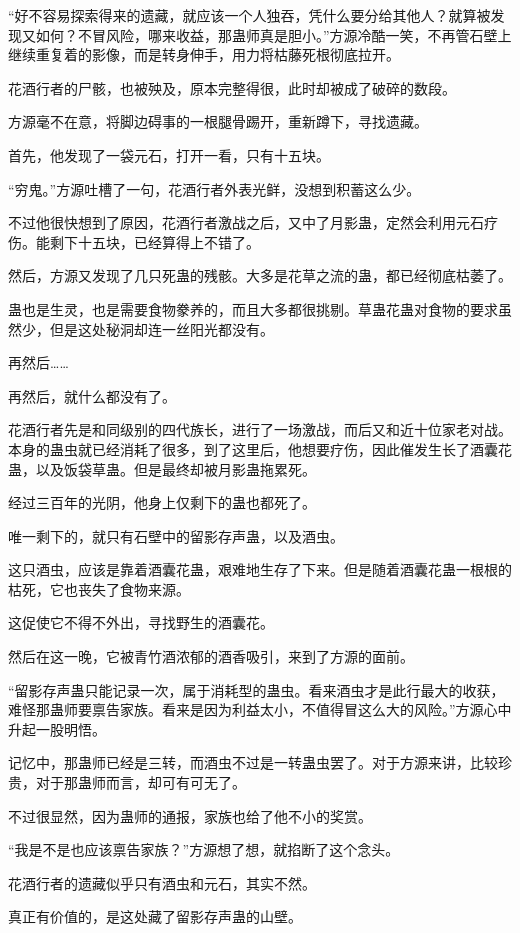 \begin{this_body}
“好不容易探索得来的遗藏，就应该一个人独吞，凭什么要分给其他人？就算被发现又如何？不冒风险，哪来收益，那蛊师真是胆小。”方源冷酷一笑，不再管石壁上继续重复着的影像，而是转身伸手，用力将枯藤死根彻底拉开。

花酒行者的尸骸，也被殃及，原本完整得很，此时却被成了破碎的数段。

方源毫不在意，将脚边碍事的一根腿骨踢开，重新蹲下，寻找遗藏。

首先，他发现了一袋元石，打开一看，只有十五块。

“穷鬼。”方源吐槽了一句，花酒行者外表光鲜，没想到积蓄这么少。

不过他很快想到了原因，花酒行者激战之后，又中了月影蛊，定然会利用元石疗伤。能剩下十五块，已经算得上不错了。

然后，方源又发现了几只死蛊的残骸。大多是花草之流的蛊，都已经彻底枯萎了。

蛊也是生灵，也是需要食物豢养的，而且大多都很挑剔。草蛊花蛊对食物的要求虽然少，但是这处秘洞却连一丝阳光都没有。

再然后……

再然后，就什么都没有了。

花酒行者先是和同级别的四代族长，进行了一场激战，而后又和近十位家老对战。本身的蛊虫就已经消耗了很多，到了这里后，他想要疗伤，因此催发生长了酒囊花蛊，以及饭袋草蛊。但是最终却被月影蛊拖累死。

经过三百年的光阴，他身上仅剩下的蛊也都死了。

唯一剩下的，就只有石壁中的留影存声蛊，以及酒虫。

这只酒虫，应该是靠着酒囊花蛊，艰难地生存了下来。但是随着酒囊花蛊一根根的枯死，它也丧失了食物来源。

这促使它不得不外出，寻找野生的酒囊花。

然后在这一晚，它被青竹酒浓郁的酒香吸引，来到了方源的面前。

“留影存声蛊只能记录一次，属于消耗型的蛊虫。看来酒虫才是此行最大的收获，难怪那蛊师要禀告家族。看来是因为利益太小，不值得冒这么大的风险。”方源心中升起一股明悟。

记忆中，那蛊师已经是三转，而酒虫不过是一转蛊虫罢了。对于方源来讲，比较珍贵，对于那蛊师而言，却可有可无了。

不过很显然，因为蛊师的通报，家族也给了他不小的奖赏。

“我是不是也应该禀告家族？”方源想了想，就掐断了这个念头。

花酒行者的遗藏似乎只有酒虫和元石，其实不然。

真正有价值的，是这处藏了留影存声蛊的山壁。


\end{this_body}
